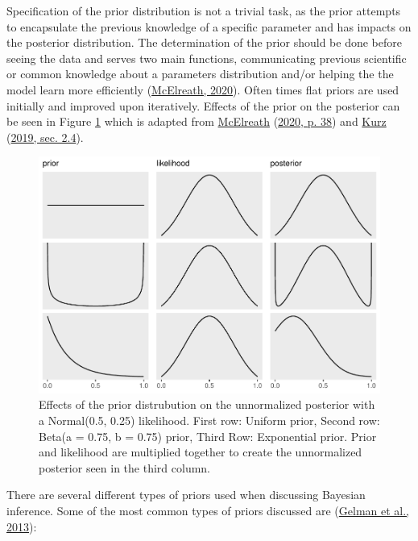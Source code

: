\documentclass[12pt,twoside]{reedthesis}
\begin{document}
Specification of the prior distribution is not a trivial task, as the prior attempts to encapsulate the previous knowledge of a specific parameter and has impacts on the posterior distribution. The determination of the prior should be done before seeing the data and serves two main functions, communicating previous scientific or common knowledge about a parameters distribution and/or helping the the model learn more efficiently (\protect\hyperlink{ref-mcelreathStatisticalRethinkingBayesian2020}{McElreath, 2020}). Often times flat priors are used initially and improved upon iteratively. Effects of the prior on the posterior can be seen in Figure \ref{fig:prioreffects} which is adapted from \protect\hyperlink{ref-mcelreathStatisticalRethinkingBayesian2020}{McElreath} (\protect\hyperlink{ref-mcelreathStatisticalRethinkingBayesian2020}{2020, p. 38}) and \protect\hyperlink{ref-kurzStatisticalRethinkingBrms2019}{Kurz} (\protect\hyperlink{ref-kurzStatisticalRethinkingBrms2019}{2019, sec. 2.4}).
\begin{figure}

{\centering \includegraphics{thesis_files/figure-latex/prioreffects-1} 

}

\caption{Effects of the prior distrubution on the unnormalized posterior with a Normal(0.5, 0.25) likelihood. First row: Uniform prior, Second row: Beta(a = 0.75, b = 0.75) prior, Third Row: Exponential prior. Prior and likelihood are multiplied together to create the unnormalized posterior seen in the third column.}\label{fig:prioreffects}
\end{figure}
There are several different types of priors used when discussing Bayesian inference. Some of the most common types of priors discussed are (\protect\hyperlink{ref-gelmanBayesianDataAnalysis2013}{Gelman et al., 2013}):
\end{document}
